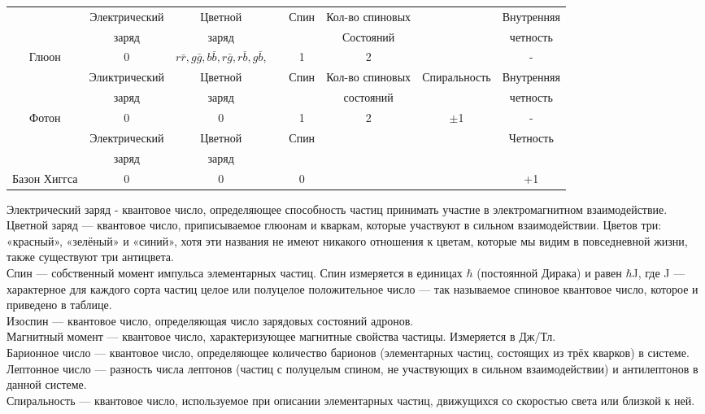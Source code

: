 \documentclass[a4paper,14pt]{article}
\begin{document}
\begin{scriptsize}
\begin{center}
\begin{tabular}{cccccccc}
\hline
& Электрический &Цветной&& Спин &Кол-во спиновых&& Внутренняя\\
& заряд &заряд&& & Состояний&& четность \\
Глюон& 0& $r\bar r, g\bar g, b\bar b, r\bar g, r\bar b, g\bar b$,&& 1& 2&& -
\\
\hline
&Эликтрический& Цветной&& Спин& Кол-во спиновых& Спиральность& Внутренняя\\
&заряд& заряд&&& состояний&&четность\\
Фотон &0& 0&& 1& 2& $\pm$1& -
\\
\hline
&Электрический& Цветной&& Спин&&& Четность\\
&заряд& заряд\\
Базон Хиггса &0& 0&& 0&&& +1\\
\hline
\end{tabular}
\end{center}
\end{scriptsize}

Электрический заряд - квантовое число, определяющее способность частиц принимать участие в электромагнитном взаимодействие.\\
Цветной заряд — квантовое число, приписываемое глюонам и кваркам, которые участвуют в сильном взаимодействии. Цветов три: «красный», «зелёный» и «синий», хотя эти названия не имеют никакого отношения к цветам, которые мы видим в повседневной жизни, также существуют три антицвета.\\
Спин — собственный момент импульса элементарных частиц. Спин измеряется в единицах $\hbar$ (постоянной Дирака) и равен $\hbar$J, где J — характерное для каждого сорта частиц целое или полуцелое положительное число — так называемое спиновое квантовое число, которое и приведено в таблице.\\
Изоспин — квантовое число, определяющая число зарядовых состояний адронов.\\
Магнитный момент — квантовое число, характеризующее магнитные свойства частицы. Измеряется в Дж/Тл.\\
Барионное число — квантовое число, определяющее количество барионов (элементарных частиц, состоящих из трёх кварков) в системе.\\
Лептонное число — разность числа лептонов (частиц с полуцелым спином, не участвующих в сильном взаимодействии) и антилептонов в данной системе.\\
Спиральность — квантовое число, используемое при описании элементарных частиц, движущихся со скоростью света или близкой к ней.
\end{document}
